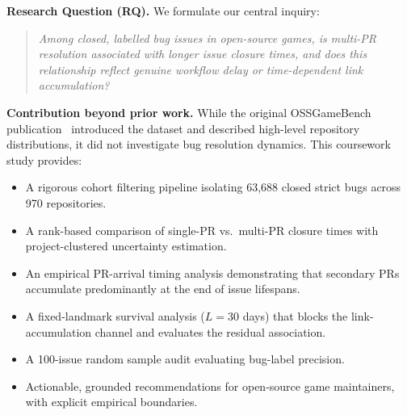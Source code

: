 \textbf{Research Question (RQ).} We formulate our central inquiry:
\begin{quote}
\emph{Among closed, labelled bug issues in open-source games, is multi-PR resolution associated with longer issue closure times, and does this relationship reflect genuine workflow delay or time-dependent link accumulation?}
\end{quote}

\textbf{Contribution beyond prior work.} While the original OSSGameBench publication~\cite{marsad2026ossgamebench} introduced the dataset and described high-level repository distributions, it did not investigate bug resolution dynamics. This coursework study provides:
\begin{itemize}
  \item A rigorous cohort filtering pipeline isolating 63,688 closed strict bugs across 970 repositories.
  \item A rank-based comparison of single-PR vs.\ multi-PR closure times with project-clustered uncertainty estimation.
  \item An empirical PR-arrival timing analysis demonstrating that secondary PRs accumulate predominantly at the end of issue lifespans.
  \item A fixed-landmark survival analysis ($L=30$ days) that blocks the link-accumulation channel and evaluates the residual association.
  \item A 100-issue random sample audit evaluating bug-label precision.
  \item Actionable, grounded recommendations for open-source game maintainers, with explicit empirical boundaries.
\end{itemize}
